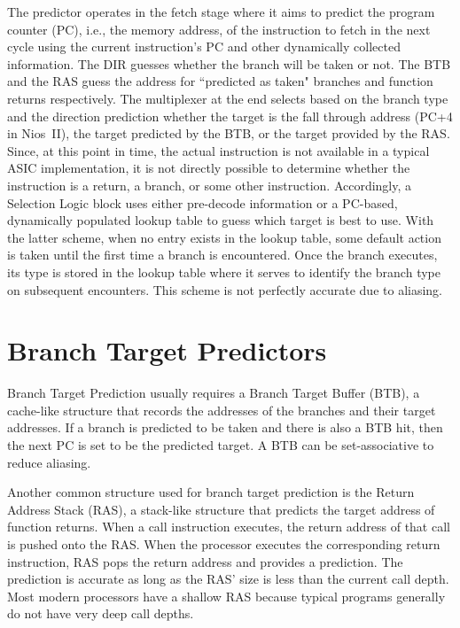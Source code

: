 The predictor operates in the fetch stage where it aims to predict the program counter (PC), i.e., the memory address, of the instruction to fetch in the next cycle using the current instruction's PC and other dynamically collected information. The DIR guesses whether the branch will be taken or not. The BTB and the RAS guess the address for ``predicted as taken" branches and function returns respectively. The multiplexer at the end selects based on the branch type and the direction prediction whether the target is the fall through address (PC+4 in Nios~II), the target predicted by the BTB, or the target provided by the RAS. Since, at this point in time, the actual instruction is not available in a typical ASIC implementation, it is not directly possible to determine whether the instruction is a return, a branch, or some other instruction. Accordingly, a Selection Logic block uses either pre-decode information or a PC-based, dynamically populated lookup table to guess which target is best to use. With the latter scheme, when no entry exists in the lookup table, some default action is taken until the first time a branch is encountered. Once the branch executes, its type is stored in the lookup table where it serves to identify the branch type on subsequent encounters. This scheme is not perfectly accurate due to aliasing.

\section{Branch Target Predictors}
\label{sec:background:target}
Branch Target Prediction usually requires a Branch Target Buffer (BTB), a cache-like structure that records the addresses of the branches and their target addresses. If a branch is predicted to be taken and there is also a BTB hit, then the next PC is set to be the predicted target. A BTB can be set-associative to reduce aliasing.

Another common structure used for branch target prediction is the Return Address Stack (RAS),  a stack-like structure that predicts the target address of function returns. When a call instruction executes, the return address of that call is pushed onto the RAS. When the processor executes the corresponding return instruction, RAS pops the return address and provides a prediction. The prediction is accurate as long as the RAS' size is less than the current call depth. Most modern processors have a shallow RAS because typical programs generally do not have very deep call depths.


